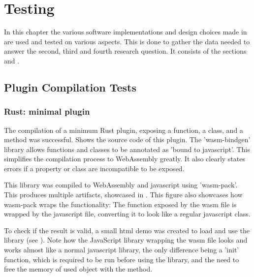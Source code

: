 \chapter{Testing}%
\label{chap:testing}

In this chapter the various software implementations and design choices made in  are used and tested on various aspects. 
This is done to gather the data needed to answer the second, third and fourth research question. 
It consists of the sections  and .


\section{Plugin Compilation Tests}
\label{sec:testing:compilation}

\subsection{Rust: minimal plugin}
The compilation of a minimum Rust plugin, exposing a function, a class, and a method was successful. 
 Shows the source code of this plugin. 
The 'wasm-bindgen' library allows functions and classes to be annotated as 'bound to javascript'. 
This simplifies the compilation process to WebAssembly greatly. 
It also clearly states errors if a property or class are incompatible to be exposed. 

This library was compiled to WebAssembly and javascript using 'wasm-pack'. 
This produces multiple artifacts, showcased in . 
This figure also showcases how wasm-pack wraps the functionality: 
The  function exposed by the wasm file is wrapped by the javascript file, converting it to look like a regular javascript class.

To check if the result is valid, a small html demo was created to load and use the library (see ).
Note how the JavaScript library wrapping the wasm file looks and works almost like a normal javascript library, the only difference being a 'init' function, which is required to be run before using the library, and the need to free the memory of used object with the  method.



